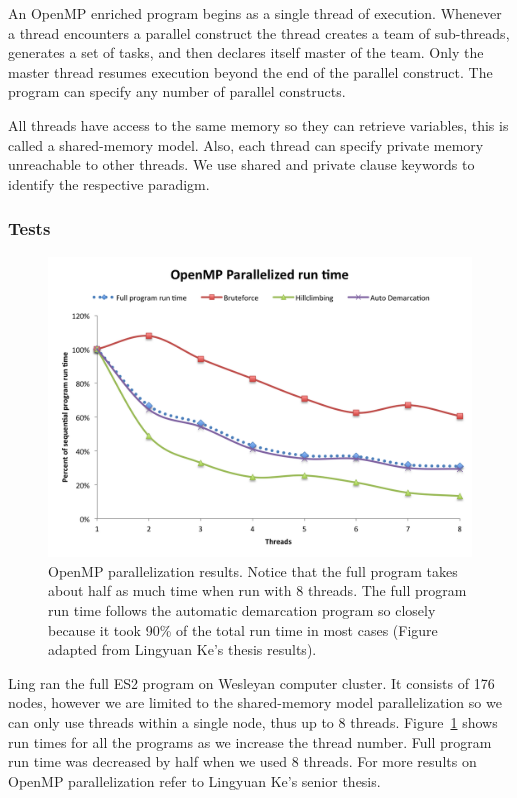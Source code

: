 An OpenMP enriched program begins as a single thread of execution.
Whenever a thread encounters a parallel construct the thread creates a team of sub-threads, generates a set of tasks, and then declares itself master of the team.
Only the master thread resumes execution beyond the end of the parallel construct.
The program can specify any number of parallel constructs.

All threads have access to the same memory so they can retrieve variables, this is called a shared-memory model.
Also, each thread can specify private memory unreachable to other threads.
We use shared and private clause keywords to identify the respective paradigm.

\subsubsection*{Tests}
\begin{figure}[h!]
\centering
\includegraphics[scale=0.6]{images/LingParallelized-CH4}
\caption[OpenMP parallelization results.]{OpenMP parallelization results. Notice that the full program takes about half as much time when run with 8 threads. The full program run time follows the automatic demarcation program so closely because it took 90\% of the total run time in most cases (Figure adapted from Lingyuan Ke's thesis results).}
\label{fig:LingParallelized}
\end{figure}

Ling ran the full ES2 program on Wesleyan computer cluster.
It consists of 176 nodes, however we are limited to the shared-memory model parallelization so we can only use threads within a single node, thus up to 8 threads.
Figure~\ref{fig:LingParallelized} shows run times for all the programs as we increase the thread number.
Full program run time was decreased by half when we used 8 threads.
For more results on OpenMP parallelization refer to Lingyuan Ke's senior thesis.

